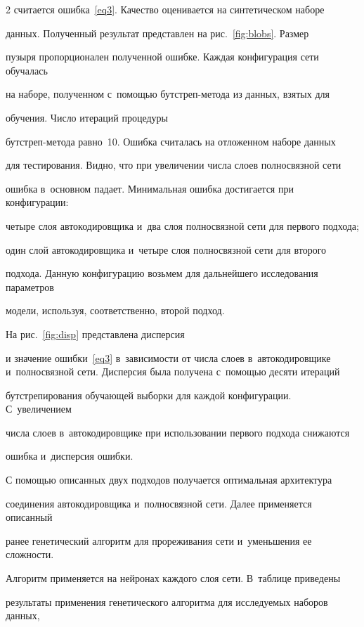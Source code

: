 \begin{multicols}{2}
считается ошибка~\eqref{eq3}. Качество оценивается на синтетическом наборе 


данных. Полученный результат представлен на рис.~\ref{fig:blobs}. Размер 


пузыря пропорционален полученной ошибке. Каждая конфигурация сети обучалась 


на наборе, полученном с~по\-мощью бут\-стреп-ме\-то\-да из данных, взятых для 


обучения. Чис\-ло итераций процедуры  


бут\-стреп-ме\-то\-да равно~10. Ошибка считалась на отложенном наборе данных 


для тестирования. Видно, что при увеличении числа слоев полносвязной сети 


ошибка в~основном падает. Минимальная ошибка достигается при конфигурации: 


четыре слоя автокодировщика и~два слоя полносвязной сети для первого подхода; 


один слой автокодировщика и~четыре слоя полносвязной сети для второго 


подхода. Данную конфигурацию возьмем для дальнейшего исследования параметров 


модели,  используя, соответственно, второй подход.





На рис.~\ref{fig:disp} представлена дисперсия %


и значение ошибки~\eqref{eq3} в~зависимости от числа слоев в~автокодировщике и~полносвязной сети. Дисперсия была получена с~помощью десяти итераций 


бутстрепирования обучающей выборки для каждой конфигурации. С~увеличением 


числа слоев в~автокодировщике при использовании первого подхода снижаются 


ошибка и~дисперсия ошибки.





С помощью описанных двух подходов получается оптимальная архитектура 


соединения автокодировщика и~полносвязной сети. Далее применяется описанный 


ранее генетический алгоритм для прореживания сети и~уменьшения ее сложности. 


Алгоритм применяется на нейронах каждого слоя сети. В~таблице приведены 


результаты применения генетического алгоритма для исследуемых наборов данных, 



\end{multicols}
